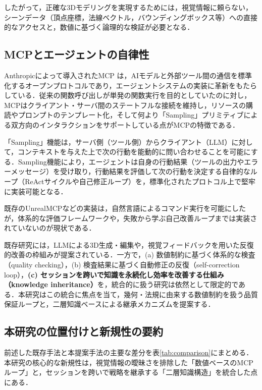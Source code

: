 \documentclass[dvipdfmx, a4paper, 9pt]{deimj}
\begin{document}
したがって，正確な3Dモデリングを実現するためには，視覚情報に頼らない，シーンデータ（頂点座標，法線ベクトル，バウンディングボックス等）への直接的なアクセスと，数値に基づく論理的な検証が必要となる．

\subsection{MCPとエージェントの自律性}

Anthropicによって導入されたMCP\cite{anthropic2024mcp} は，AIモデルと外部ツール間の通信を標準化するオープンプロトコルであり，エージェントシステムの実装に革新をもたらしている．従来の関数呼び出しが単発の関数実行を目的としていたのに対し\cite{schick2024toolformer}，MCPはクライアント・サーバ間のステートフルな接続を維持し，リソースの購読やプロンプトのテンプレート化，そして何より「Sampling」プリミティブによる双方向のインタラクションをサポートしている点がMCPの特徴である．

「Sampling」機能は，サーバ側（ツール側）からクライアント（LLM）に対して，コンテキストを与えた上で次の行動を能動的に問い合わせることを可能にする．Sampling機能により，エージェントは自身の行動結果（ツールの出力やエラーメッセージ）を受け取り，行動結果を評価して次の行動を決定する自律的なループ（ReActサイクル\cite{yao2023react}や自己修正ループ\cite{shinn2024reflexion,xi2023rise}）を，標準化されたプロトコル上で堅牢に実装可能となる．

既存のUnrealMCP\cite{unrealmcp2024}などの実装は，自然言語によるコマンド実行を可能にしたが，体系的な評価フレームワークや，失敗から学ぶ自己改善ループまでは実装されていないのが現状である．

既存研究には，LLMによる3D生成・編集や，視覚フィードバックを用いた反復的改善の枠組みが提案されている．一方で，(a) 数値制約に基づく体系的な検査（quality checking），(b) 検査結果に基づく自動修正の反復（self-correction loop），\textbf{(c) セッションを跨いで知識を永続化し効率を改善する仕組み（knowledge inheritance）}を，統合的に扱う研究は依然として限定的である．本研究はこの統合に焦点を当て，幾何・法規に由来する数値制約を扱う品質保証ループと，二層知識ベースによる継承メカニズムを提案する．

\subsection{本研究の位置付けと新規性の要約}

前述した既存手法と本提案手法の主要な差分を表\ref{tab:comparison}にまとめる．本研究の核心的な新規性は，視覚情報の曖昧さを排除した「数値ベースのMCPループ」と，セッションを跨いで戦略を継承する「二層知識構造」を統合した点にある．
\end{document}
